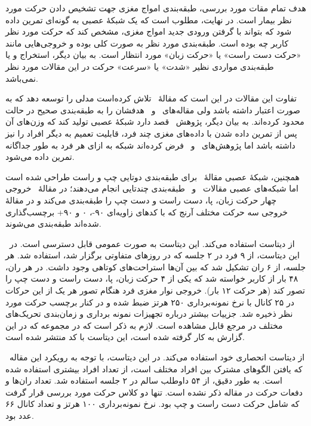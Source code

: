 هدف تمام مقات مورد بررسی، طبقه‌بندی امواج مغزی جهت تشخیص دادن حرکت مورد نظر بیمار است. در نهایت، مطلوب است که یک شبکهٔ عصبی به گونه‌ای تمرین داده شود که بتواند با گرفتن ورودی جدید امواج مغزی، مشخص کند که حرکت مورد نظر کاربر چه بوده است. طبقه‌بندی مورد نظر به صورت کلی بوده و خروجی‌هایی مانند «حرکت دست راست» یا «حرکت زبان» مورد انتظار است. به بیان دیگر، استخراج و یا طبقه‌بندی مواردی نظیر «شدت» یا «سرعت» حرکت در این مقالات مورد نظر نمی‌باشد.

تفاوت این مقالات در این است که مقالهٔ \ب\ تلاش کرده‌است مدلی را توسعه دهد که به صورت  اعتبار داشته باشد ولی مقاله‌های \آ\ و \پ\ هدفشان را به طبقه‌بندی صحیح در حالت  محدود کرده‌اند. به بیان دیگر، پژوهش \ب\ قصد دارد شبکهٔ عصبی تولید کند که وزن‌های آن پس از تمرین داده شدن با داده‌های مغزی چند فرد، قابلیت تعمیم به دیگر افراد را نیز داشته باشد اما پژوهش‌های \آ\ و \پ\ فرض کرده‌اند شبکه به ازای هر فرد به طور جداگانه تمرین داده می‌شود.

همچنین، شبکهٔ عصبی مقالهٔ \ب\ برای طبقه‌بندی دوتایی چپ و راست طراحی شده است اما شبکه‌های عصبی مقالات \آ\ و \پ\ طبقه‌بندی چندتایی انجام می‌دهند؛‌ در مقالهٔ \آ\ خروجی چهار حرکت زبان، پا، دست راست و دست چپ را طبقه‌بندی می‌کند و در مقالهٔ \پ\ خروجی سه حرکت مختلف آرنج که با کدهای زاویه‌ای ۹۰-، ۰ و ۹۰+ برچسب‌گذاری شده‌اند طبقه‌بندی می‌شوند.

\آ\ از دیتاست  استفاده می‌کند. این دیتاست به صورت عمومی قابل دسترسی است. در این دیتاست، از ۹ فرد در ۲ جلسه که در روزهای متفاوتی برگزار شد، استفاده شد. هر جلسه، از ۶ ران تشکیل شد که بین آن‌ها استراحت‌های کوتاهی وجود داشت. در هر ران، ۴۸ بار از کاربر خواسته شد که یکی از ۴ حرکت زبان، پا، دست راست و دست چپ را تصور کند (هر حرکت ۱۲ بار). خروجی نوار مغزی فرد هنگام تصور هر یک از این حرکات در ۲۵ کانال با نرخ نمونه‌برداری ۲۵۰ هرتز ضبط شده و در کنار برچسب حرکت مورد نظر ذخیره شد. جزییات بیشتر درباره تجهیزات نمونه برداری و زمان‌بندی تحریک‌های مختلف در مرجع  قابل مشاهده است. لازم به ذکر است که در مجموعه  که در این گزارش به کار گرفته شده است، این دیتاست با کد  منتشر شده است.

\ب\ از دیتاست انحصاری خود استفاده می‌کند. در این دیتاست، با توجه به رویکرد این مقاله که یافتن الگوهای مشترک بین افراد مختلف است، از تعداد افراد بیشتری استفاده شده است. به طور دقیق، از ۵۴ داوطلب سالم در ۲ جلسه استفاده شد. تعداد ران‌ها و دفعات حرکت در مقاله ذکر نشده است. تنها دو کلاس حرکت مورد بررسی قرار گرفت که شامل حرکت دست راست و چپ بود. نرخ نمونه‌برداری ۱۰۰ هرتز و تعداد کانال ۶۶ عدد بود.

